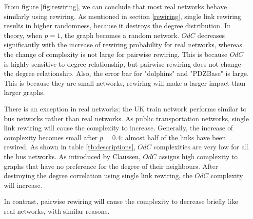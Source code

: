 \documentclass[12pt]{article}
\begin{document}
\par
From figure \ref{fig:rewiring}, we can conclude that most real networks behave similarly using rewiring. As mentioned in section \ref{rewiring}, single link rewiring results in higher randomness, because it destroys the degree distribution. In theory, when $p=1$, the graph becomes a random network. $OdC$ decreases significantly with the increase of rewiring probability for real networks, whereas the change of complexity is not large for pairwise rewiring. This is because $OdC$ is highly sensitive to degree relationship, but pairwise rewiring does not change the degree relationship. Also, the error bar for "dolphins" and "PDZBase" is large. This is because they are small networks, rewiring will make a larger impact than larger graphs.\par
There is an exception in real networks; the UK train network performs similar to bus networks rather than real networks. As public transportation networks, single link rewiring will cause the complexity to increase. Generally, the increase of complexity becomes small after $p=0.4$; almost half of the links have been rewired. As shown in table \ref{tb:descriptions}, $OdC$ complexities are very low for all the bus networks. As introduced by Claussen\cite{odc}, $OdC$ assigns high complexity to graphs that have no preference for the degree of their neighbours. After destroying the degree correlation using single link rewiring, the $OdC$ complexity will increase.\par
In contrast, pairwise rewiring will cause the complexity to decrease briefly like real networks, with similar reasons.
\end{document}

